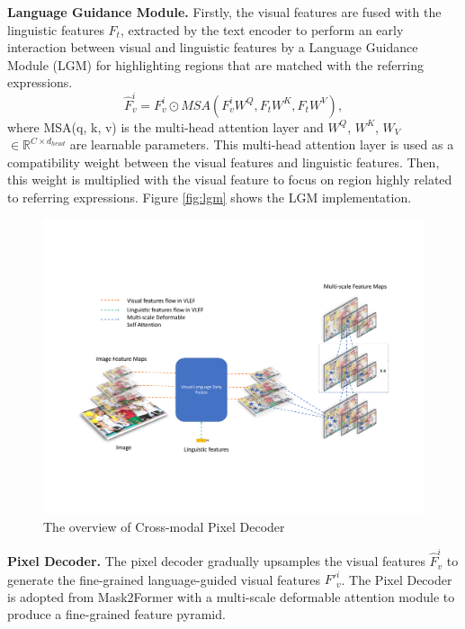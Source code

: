 \textbf{Language Guidance Module.} 
Firstly, the visual features are fused with the linguistic features ${F_t}$, extracted by the text encoder to perform an early interaction between visual and linguistic features by a Language Guidance Module (LGM) for highlighting regions that are matched with the referring expressions. 
\begin{equation}
    \hat{F}_v^i = F_v^i \odot MSA(F_v^iW^Q, F_tW^K, F_tW^V),
\end{equation}
where MSA(q, k, v) is the multi-head attention layer and $W^Q$, $W^K$, $W_V$ $\in \mathbb{R}^{C \times d_{head}}$ are learnable parameters. This multi-head attention layer is used as a compatibility weight between the visual features and linguistic features. Then, this weight is multiplied with the visual feature to focus on region highly related to referring expressions. Figure \ref{fig:lgm} shows the LGM implementation.


\begin{figure}[t]
    \centering
    \includegraphics[width=\textwidth]{content/resources/images/referring_segmentation/Cross-modal_Pixel_Decoder.pdf}
    \caption{The overview of Cross-modal Pixel Decoder}
    \label{fig:pixel_decoder}
\end{figure}

\textbf{Pixel Decoder.}
The pixel decoder gradually upsamples the visual features $\hat{F}_v^i$ to generate the fine-grained language-guided visual features $F'_v^i$. 
The Pixel Decoder is adopted from Mask2Former \cite{cheng_masked-attention_2022} with a multi-scale deformable attention module to produce a fine-grained feature pyramid. 

